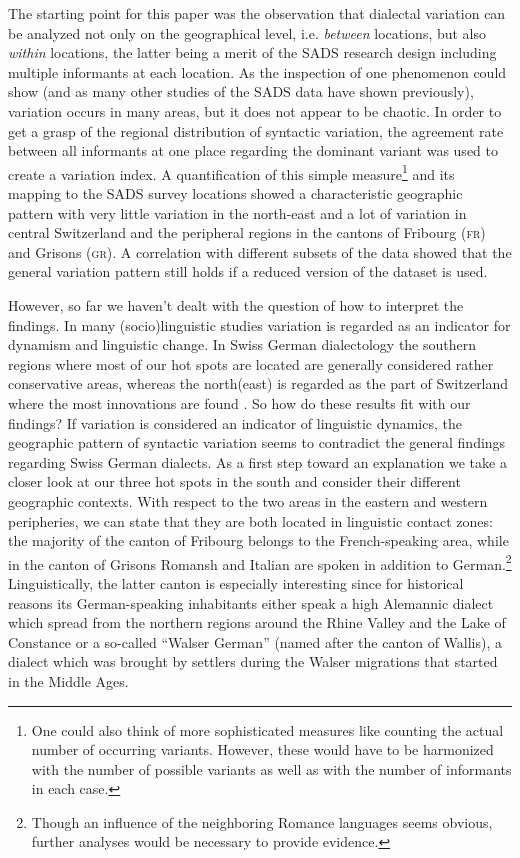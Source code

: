 \documentclass[output=paper]{LSP/langsci}
\begin{document}
The starting point for this paper was the observation that dialectal variation can be analyzed not only on the geographical level, i.e. \emph{between} locations, but also \emph{within} locations, the latter being a merit of the SADS research design including multiple informants at each location. As the inspection of one phenomenon could show (and as many other studies of the SADS data have shown previously), variation occurs in many areas, but it does not appear to be chaotic. In order to get a grasp of the regional distribution of syntactic variation, the agreement rate between all informants at one place regarding the dominant variant was used to create a variation index. A quantification of this simple measure\footnote{ One could also think of more sophisticated measures like counting the actual number of occurring variants. However, these would have to be harmonized with the number of possible variants as well as with the number of informants in each case.} and its mapping to the SADS survey locations showed a characteristic geographic pattern with very little variation in the north-east and a lot of variation in central Switzerland and the peripheral regions in the cantons of Fribourg (\textsc{fr}) and Grisons (\textsc{gr}). A correlation with different subsets of the data showed that the general variation pattern still holds if a reduced version of the dataset is used.

However, so far we haven’t dealt with the question of how to interpret the findings. In many (socio)linguistic studies variation is regarded as an indicator for dynamism and linguistic change. In Swiss German dialectology the southern regions where most of our hot spots are located are generally considered rather conservative areas, whereas the north(east) is regarded as the part of Switzerland where the most innovations are found \citep{haas_deutschsprachige_2000}. So how do these results fit with our findings? If variation is considered an indicator of linguistic dynamics, the geographic pattern of syntactic variation seems to contradict the general findings regarding Swiss German dialects. As a first step toward an explanation we take a closer look at our three hot spots in the south and consider their different geographic contexts. With respect to the two areas in the eastern and western peripheries, we can state that they are both located in linguistic contact zones: the majority of the canton of Fribourg belongs to the French-speaking area, while in the canton of Grisons Romansh and Italian are spoken in addition to German.\footnote{ Though an influence of the neighboring Romance languages seems obvious, further analyses would be necessary to provide evidence.} Linguistically, the latter canton is especially interesting since for historical reasons its German-speaking inhabitants either speak a high Alemannic dialect which spread from the northern regions around the Rhine Valley and the Lake of Constance or a so-called “Walser German” (named after the canton of Wallis), a dialect which was brought by settlers during the Walser migrations that started in the Middle Ages.
\end{document}

